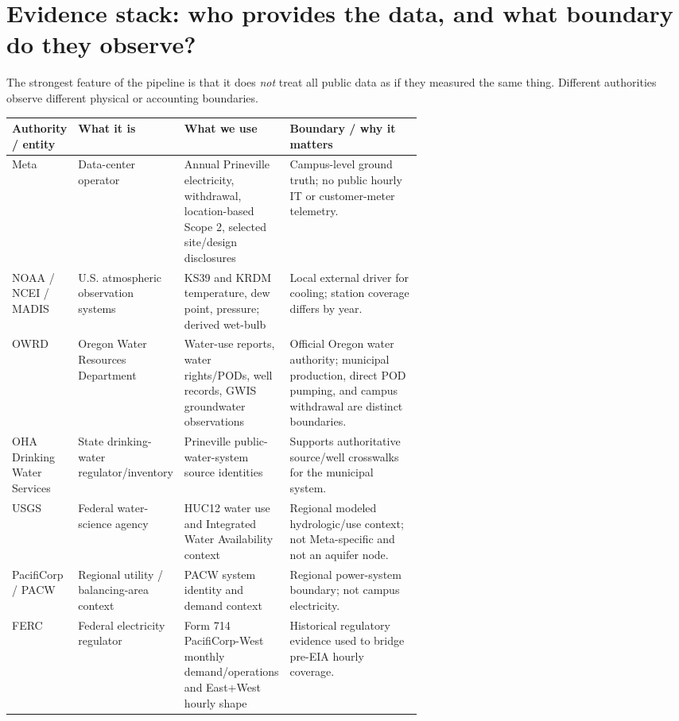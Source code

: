 \documentclass[11pt]{article}
\begin{document}
\section{Evidence stack: who provides the data, and what boundary do they observe?}

The strongest feature of the pipeline is that it does \emph{not} treat all public data as if they measured the same thing. Different authorities observe different physical or accounting boundaries.

\begin{table}[ht]
\centering
\small
\begin{tabularx}{\linewidth}{@{}p{0.15\linewidth}p{0.22\linewidth}p{0.23\linewidth}Y@{}}
\toprule
\textbf{Authority / entity} & \textbf{What it is} & \textbf{What we use} & \textbf{Boundary / why it matters} \\
\midrule
Meta & Data-center operator & Annual Prineville electricity, withdrawal, location-based Scope 2, selected site/design disclosures & Campus-level ground truth; no public hourly IT or customer-meter telemetry. \\
NOAA / NCEI / MADIS & U.S. atmospheric observation systems & KS39 and KRDM temperature, dew point, pressure; derived wet-bulb & Local external driver for cooling; station coverage differs by year. \\
OWRD & Oregon Water Resources Department & Water-use reports, water rights/PODs, well records, GWIS groundwater observations & Official Oregon water authority; municipal production, direct POD pumping, and campus withdrawal are distinct boundaries. \\
OHA Drinking Water Services & State drinking-water regulator/inventory & Prineville public-water-system source identities & Supports authoritative source/well crosswalks for the municipal system. \\
USGS & Federal water-science agency & HUC12 water use and Integrated Water Availability context & Regional modeled hydrologic/use context; not Meta-specific and not an aquifer node. \\
PacifiCorp / PACW & Regional utility / balancing-area context & PACW system identity and demand context & Regional power-system boundary; not campus electricity. \\
FERC & Federal electricity regulator & Form 714 PacifiCorp-West monthly demand/operations and East+West hourly shape & Historical regulatory evidence used to bridge pre-EIA hourly coverage. \\

\end{tabularx}
\end{table}
\end{document}
